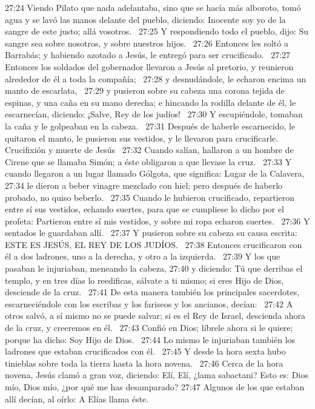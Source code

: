 27:24 Viendo Pilato que nada adelantaba, sino que se hacía más alboroto, tomó agua y se lavó las manos delante del pueblo, diciendo: Inocente soy yo de la sangre de este justo; allá vosotros.  
27:25 Y respondiendo todo el pueblo, dijo: Su sangre sea sobre nosotros, y sobre nuestros hijos.  
27:26 Entonces les soltó a Barrabás; y habiendo azotado a Jesús, le entregó para ser crucificado.  
27:27 Entonces los soldados del gobernador llevaron a Jesús al pretorio, y reunieron alrededor de él a toda la compañía;  
27:28 y desnudándole, le echaron encima un manto de escarlata,  
27:29 y pusieron sobre su cabeza una corona tejida de espinas, y una caña en su mano derecha; e hincando la rodilla delante de él, le escarnecían, diciendo: ¡Salve, Rey de los judíos!  
27:30 Y escupiéndole, tomaban la caña y le golpeaban en la cabeza.  
27:31 Después de haberle escarnecido, le quitaron el manto, le pusieron sus vestidos, y le llevaron para crucificarle.  
Crucifixión y muerte de Jesús   
27:32 Cuando salían, hallaron a un hombre de Cirene que se llamaba Simón; a éste obligaron a que llevase la cruz.  
27:33 Y cuando llegaron a un lugar llamado Gólgota, que significa: Lugar de la Calavera,  
27:34 le dieron a beber vinagre mezclado con hiel; pero después de haberlo probado, no quiso beberlo.  
27:35 Cuando le hubieron crucificado, repartieron entre sí sus vestidos, echando suertes, para que se cumpliese lo dicho por el profeta: Partieron entre sí mis vestidos, y sobre mi ropa echaron suertes.  
27:36 Y sentados le guardaban allí.  
27:37 Y pusieron sobre su cabeza su causa escrita: ESTE ES JESÚS, EL REY DE LOS JUDÍOS.  
27:38 Entonces crucificaron con él a dos ladrones, uno a la derecha, y otro a la izquierda.  
27:39 Y los que pasaban le injuriaban, meneando la cabeza, 
27:40 y diciendo: Tú que derribas el templo, y en tres días lo reedificas, sálvate a ti mismo; si eres Hijo de Dios, desciende de la cruz.  
27:41 De esta manera también los principales sacerdotes, escarneciéndole con los escribas y los fariseos y los ancianos, decían:  
27:42 A otros salvó, a sí mismo no se puede salvar; si es el Rey de Israel, descienda ahora de la cruz, y creeremos en él.  
27:43 Confió en Dios; líbrele ahora si le quiere; porque ha dicho: Soy Hijo de Dios.  
27:44 Lo mismo le injuriaban también los ladrones que estaban crucificados con él.  
27:45 Y desde la hora sexta hubo tinieblas sobre toda la tierra hasta la hora novena.  
27:46 Cerca de la hora novena, Jesús clamó a gran voz, diciendo: Elí, Elí, ¿lama sabactani? Esto es: Dios mío, Dios mío, ¿por qué me has desamparado? 
27:47 Algunos de los que estaban allí decían, al oírlo: A Elías llama éste.  

